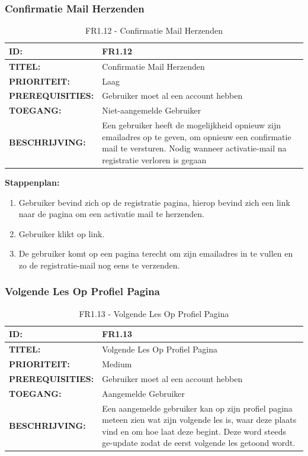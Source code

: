 \subsubsection{Confirmatie Mail Herzenden}
	\begin{table}[H]
	\caption{FR1.12 - Confirmatie Mail Herzenden}
    		\begin{tabular}{l | p{10cm}}
        \textbf{ID:} & FR1.12 \\ \hline
        \textbf{TITEL:} & Confirmatie Mail Herzenden \\ \hline
        \textbf{PRIORITEIT:} &  Laag \\ \hline
        \textbf{PREREQUISITIES:} & Gebruiker moet al een account hebben\\ \hline
        \textbf{TOEGANG:} &  Niet-aangemelde Gebruiker \\ \hline
        \textbf{BESCHRIJVING:} & Een gebruiker heeft de mogelijkheid opnieuw zijn emailadres op te geven, om opnieuw een confirmatie mail te versturen. Nodig wanneer activatie-mail na registratie verloren is gegaan\\
    \end{tabular} 
	\label{tab:FR1.12 -Profiel aanmaken}
\end{table}

\textbf{Stappenplan:}
\begin{enumerate}
\item Gebruiker bevind zich op de registratie pagina, hierop bevind zich een link naar de pagina om een activatie mail te herzenden.
\item Gebruiker klikt op link.
\item De gebruiker komt op een pagina terecht om zijn emailadres in te vullen en zo de registratie-mail nog eens te verzenden.
\end{enumerate}

\subsubsection{Volgende Les Op Profiel Pagina}
	\begin{table}[H]
	\caption{FR1.13 - Volgende Les Op Profiel Pagina}
    		\begin{tabular}{l | p{10cm}}
        \textbf{ID:} & FR1.13 \\ \hline
        \textbf{TITEL:} & Volgende Les Op Profiel Pagina \\ \hline
        \textbf{PRIORITEIT:} &  Medium \\ \hline
        \textbf{PREREQUISITIES:} & Gebruiker moet al een account hebben\\ \hline
        \textbf{TOEGANG:} &  Aangemelde Gebruiker \\ \hline
        \textbf{BESCHRIJVING:} & Een aangemelde gebruiker kan op zijn profiel pagina meteen zien wat zijn volgende les is, waar deze plaats vind en om hoe laat deze begint. Deze word steeds ge-update zodat de eerst volgende les getoond wordt. \\
    \end{tabular} 
	\label{tab:FR1.13 -Profiel aanmaken}
\end{table}
\clearpage
